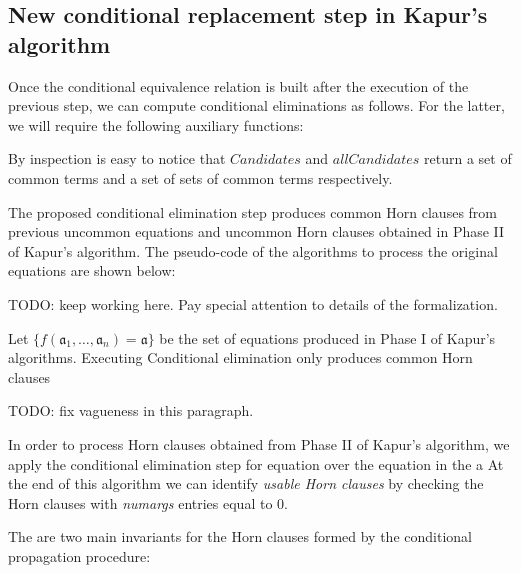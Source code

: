 \subsection{New conditional replacement
step in Kapur's algorithm}

Once the conditional equivalence relation is built after 
the execution of the previous step, we can compute conditional eliminations
as follows. For the latter, we will require the following auxiliary functions:




By inspection is easy to notice that $Candidates$ 
and $allCandidates$ return a set of common terms and
a set of sets of common terms respectively.

The proposed conditional elimination step produces common Horn 
clauses from previous uncommon equations and uncommon Horn 
clauses obtained in Phase II of Kapur's algorithm.
The pseudo-code of the algorithms to 
process the original equations are shown below:




TODO: keep working here. Pay special attention to details of
the formalization.

\begin{lemma}
  Let $\{f(\mathfrak{a}_1, \dots, \mathfrak{a}_n) 
  = \mathfrak{a}\}$ be the set of equations produced
  in Phase I of Kapur's algorithms.
  Executing Conditional elimination only produces common 
  Horn clauses
\end{lemma}

TODO: fix vagueness in this paragraph.

In order to process Horn clauses obtained 
from Phase II of Kapur's algorithm, we apply 
the conditional elimination step for equation
over the equation in the a
At the end of this algorithm we can identify 
\emph{usable Horn clauses} by checking the Horn clauses
with \emph{numargs} entries equal to 0. 


The are two main invariants for the Horn clauses formed by the
conditional propagation procedure: 

